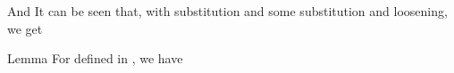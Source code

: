 And
It can be seen that, with substitution  and some substitution and loosening, we get


\Result
{Lemma}
{
For \m {\Xi} defined in , we have
}



